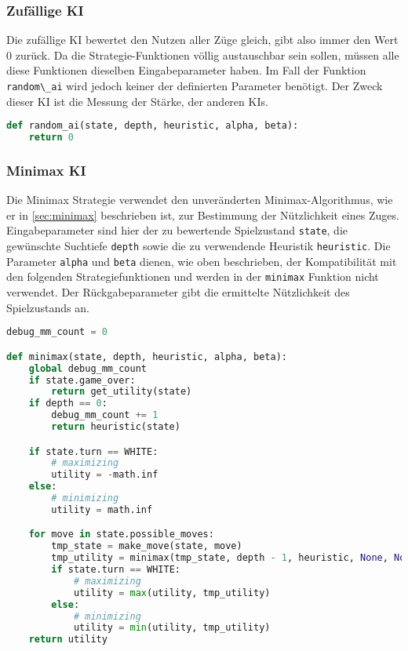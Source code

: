 \hypertarget{zufuxe4llige-ki}{%
\subsubsection{Zufällige KI}\label{zufuxe4llige-ki}}

Die zufällige \ac{KI} bewertet den Nutzen aller Züge gleich, gibt also
immer den Wert \(0\) zurück. Da die Strategie-Funktionen völlig
austauschbar sein sollen, müssen alle diese Funktionen dieselben
Eingabeparameter haben. Im Fall der Funktion
\passthrough{\lstinline!random\_ai!} wird jedoch keiner der definierten
Parameter benötigt. Der Zweck dieser \ac{KI} ist die Messung der Stärke,
der anderen \acp{KI}.

\begin{lstlisting}[language=Python]
def random_ai(state, depth, heuristic, alpha, beta):
    return 0
\end{lstlisting}

\hypertarget{minimax-ki}{%
\subsubsection{Minimax KI}\label{minimax-ki}}

Die Minimax Strategie verwendet den unveränderten Minimax-Algorithmus,
wie er in \autoref{sec:minimax} beschrieben ist, zur Bestimmung der
Nützlichkeit eines Zuges. Eingabeparameter sind hier der zu bewertende
Spielzustand \passthrough{\lstinline!state!}, die gewünschte Suchtiefe
\passthrough{\lstinline!depth!} sowie die zu verwendende Heuristik
\passthrough{\lstinline!heuristic!}. Die Parameter
\passthrough{\lstinline!alpha!} und \passthrough{\lstinline!beta!}
dienen, wie oben beschrieben, der Kompatibilität mit den folgenden
Strategiefunktionen und werden in der \passthrough{\lstinline!minimax!}
Funktion nicht verwendet. Der Rückgabeparameter gibt die ermittelte
Nützlichkeit des Spielzustands an.

\begin{lstlisting}[language=Python]
debug_mm_count = 0

def minimax(state, depth, heuristic, alpha, beta):
    global debug_mm_count
    if state.game_over:
        return get_utility(state)
    if depth == 0:
        debug_mm_count += 1
        return heuristic(state)

    if state.turn == WHITE:
        # maximizing
        utility = -math.inf
    else:
        # minimizing
        utility = math.inf

    for move in state.possible_moves:
        tmp_state = make_move(state, move)
        tmp_utility = minimax(tmp_state, depth - 1, heuristic, None, None)
        if state.turn == WHITE:
            # maximizing
            utility = max(utility, tmp_utility)
        else:
            # minimizing
            utility = min(utility, tmp_utility)
    return utility
\end{lstlisting}

